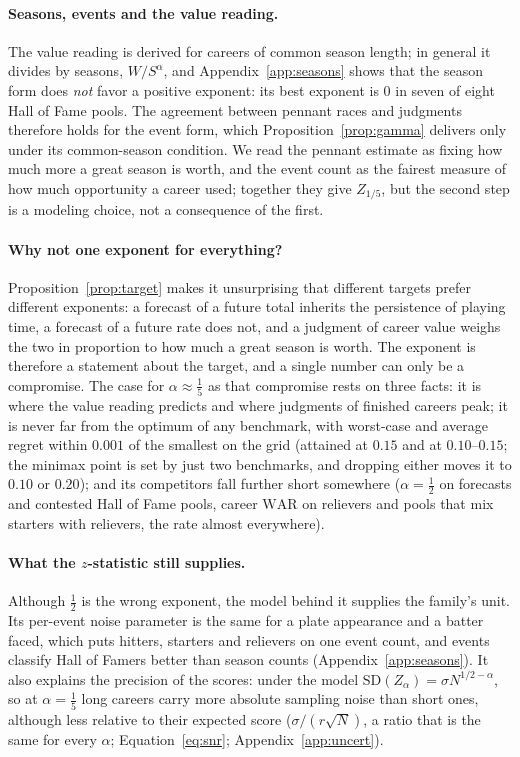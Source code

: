 \documentclass[11pt,letterpaper]{article}
\theoremstyle{plain}
\theoremstyle{definition}
\theoremstyle{remark}
\newcommand{\WAR}{\mathrm{WAR}}
\newcommand{\SD}{\mathrm{SD}}
\begin{document}
\paragraph{Seasons, events and the value reading.} The value reading is derived for careers of common season length; in general it divides by seasons, $W/S^{\alpha}$, and Appendix~\ref{app:seasons} shows that the season form does \emph{not} favor a positive exponent: its best exponent is $0$ in seven of eight Hall of Fame pools. The agreement between pennant races and judgments therefore holds for the event form, which Proposition~\ref{prop:gamma} delivers only under its common-season condition. We read the pennant estimate as fixing how much more a great season is worth, and the event count as the fairest measure of how much opportunity a career used; together they give $Z_{1/5}$, but the second step is a modeling choice, not a consequence of the first.

\paragraph{Why not one exponent for everything?} Proposition~\ref{prop:target} makes it unsurprising that different targets prefer different exponents: a forecast of a future total inherits the persistence of playing time, a forecast of a future rate does not, and a judgment of career value weighs the two in proportion to how much a great season is worth. The exponent is therefore a statement about the target, and a single number can only be a compromise. The case for $\alpha \approx \tfrac15$ as that compromise rests on three facts: it is where the value reading predicts and where judgments of finished careers peak; it is never far from the optimum of any benchmark, with worst-case and average regret within $0.001$ of the smallest on the grid (attained at $0.15$ and at $0.10$--$0.15$; the minimax point is set by just two benchmarks, and dropping either moves it to $0.10$ or $0.20$); and its competitors fall further short somewhere ($\alpha = \tfrac12$ on forecasts and contested Hall of Fame pools, career $\WAR$ on relievers and pools that mix starters with relievers, the rate almost everywhere).

\paragraph{What the $z$-statistic still supplies.} Although $\tfrac12$ is the wrong exponent, the model behind it supplies the family's unit. Its per-event noise parameter is the same for a plate appearance and a batter faced, which puts hitters, starters and relievers on one event count, and events classify Hall of Famers better than season counts (Appendix~\ref{app:seasons}). It also explains the precision of the scores: under the model $\SD(Z_\alpha) = \sigma N^{1/2-\alpha}$, so at $\alpha = \tfrac15$ long careers carry more absolute sampling noise than short ones, although less relative to their expected score ($\sigma/(r\sqrt N)$, a ratio that is the same for every $\alpha$; Equation~\eqref{eq:snr}; Appendix~\ref{app:uncert}).
\end{document}

